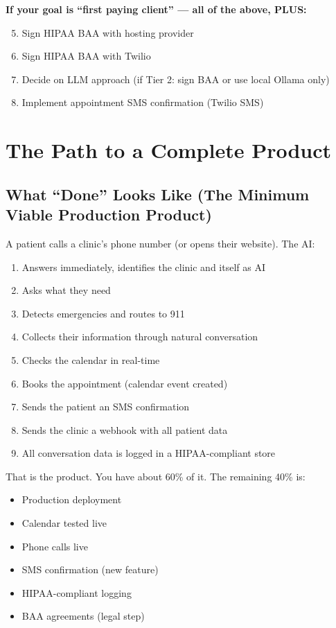 \documentclass[12pt, a4paper]{report}
\begin{document}
\textbf{If your goal is ``first paying client'' --- all of the above, PLUS:}
\begin{enumerate}
  \setcounter{enumi}{4}
  \item Sign HIPAA BAA with hosting provider
  \item Sign HIPAA BAA with Twilio
  \item Decide on LLM approach (if Tier 2: sign BAA or use local Ollama only)
  \item Implement appointment SMS confirmation (Twilio SMS)
\end{enumerate}

\chapter{The Path to a Complete Product}

\section{What ``Done'' Looks Like (The Minimum Viable Production Product)}

A patient calls a clinic's phone number (or opens their website). The AI:
\begin{enumerate}
  \item Answers immediately, identifies the clinic and itself as AI
  \item Asks what they need
  \item Detects emergencies and routes to 911
  \item Collects their information through natural conversation
  \item Checks the calendar in real-time
  \item Books the appointment (calendar event created)
  \item Sends the patient an SMS confirmation
  \item Sends the clinic a webhook with all patient data
  \item All conversation data is logged in a HIPAA-compliant store
\end{enumerate}

That is the product. You have about 60\% of it. The remaining 40\% is:
\begin{itemize}
  \item Production deployment
  \item Calendar tested live
  \item Phone calls live
  \item SMS confirmation (new feature)
  \item HIPAA-compliant logging
  \item BAA agreements (legal step)
\end{itemize}
\end{document}
